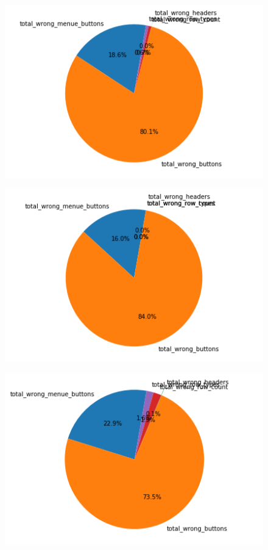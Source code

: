 \documentclass[pdftex,a4paper,halfparskip, article]{scrartcl}
\begin{document}
\begin{figure}
\centering
\begin{minipage}{.33\textwidth}
  \centering
  \includegraphics[width=1\linewidth]{predictions_bin15_total_error_types_pie_chart}
  \label{fig:fehler_gesamt_bin15}
\end{minipage}%
\begin{minipage}{.33\textwidth}
  \centering
  \includegraphics[width=1\linewidth]{predictions_bin15_excluded_p80_error_types_pie_chart}
  \label{fig:fehler_beste80_bin15}
\end{minipage}
\begin{minipage}{.33\textwidth}
  \centering
   \includegraphics[width=1\linewidth]{predictions_bin15_p80_error_types_pie_chart}

\end{minipage}
\end{figure}
\end{document}
